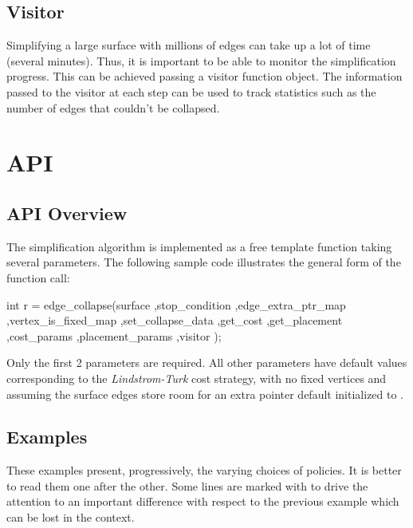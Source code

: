 \subsection{Visitor}

Simplifying a large surface with millions of edges can take up a lot of time (several minutes). Thus, it is important to be able to monitor the simplification progress. This can be achieved passing a visitor function object. The information passed to the visitor at each step can be used to track statistics such as the number of edges that couldn't be collapsed.

\section{API}

\subsection{API Overview}

The simplification algorithm is implemented as a free template function taking several parameters. The following sample code illustrates the general form of the function call:

\begin{cprog}
int r = edge_collapse(surface
                     ,stop_condition
                     ,edge_extra_ptr_map
                     ,vertex_is_fixed_map
                     ,set_collapse_data
                     ,get_cost
                     ,get_placement
                     ,cost_params
                     ,placement_params
                     ,visitor 
                     );
\end{cprog}

Only the first 2 parameters are required. All other parameters have default values corresponding to the {\em Lindstrom-Turk} cost strategy, with no fixed vertices and assuming the surface edges store room for an extra pointer default initialized to .

\subsection{Examples}

These examples present, progressively, the varying choices of policies. It is better to read them one after the other.
Some lines are marked with  to drive the attention to an important difference with respect to the previous example which can be lost in the context.


